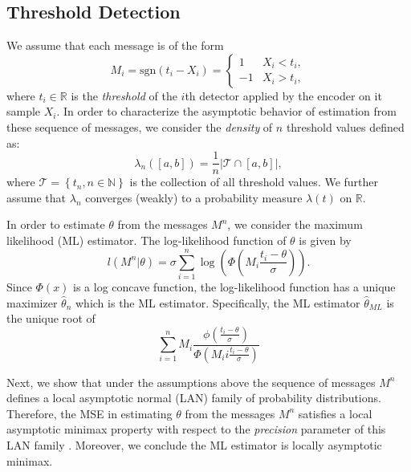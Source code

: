 \documentclass[letterpaper, conference]{IEEEtran}      %
\newcommand{\sgn}{\mathrm{sgn} }
\begin{document}
\subsection{Threshold Detection}
We assume that each message is of the form
\[
M_i = \sgn(t_i - X_i) = \begin{cases} 1 & X_i< t_i, \\
-1 & X_i > t_i,
\end{cases}  
\]
where $t_i\in\mathbb R$ is the \emph{threshold} of the $i$th detector applied by the encoder on it sample $X_i$. In order to characterize the asymptotic behavior of estimation from these sequence of messages, we consider the \emph{density} of $n$ threshold values defined as:
\[
\lambda_n([a,b]) = \frac{1}{n} \left| \mathcal T \cap [a,b] \right|,
\]
where $\mathcal T  = \left\{t_n, n \in \mathbb N \right\}$ is the collection of all threshold values. We further assume that $\lambda_n$ converges (weakly) to a probability measure $\lambda(t)$ on $\mathbb R$.  \par
In order to estimate $\theta$ from the messages $M^n$, we consider the maximum likelihood (ML) estimator. The log-likelihood function of $\theta$ is given by
\[
l(M^n  |\theta ) = \sigma  \sum_{i=1}^n \log \left( \Phi \left( M_i \frac{t_i - \theta}{\sigma} \right) \right). 
\]
Since $\Phi(x)$ is a log concave function, the log-likelihood function has a unique maximizer $\widehat{\theta}_n$ which is the ML estimator. Specifically, the ML estimator $\widehat{\theta}_{ML}$ is the unique root of 
\[
\sum_{i=1}^n M_i \frac{\phi \left( \frac{t_i-\theta}{\sigma}\right) }{\Phi \left(M_ii \frac{t_i-\theta}{\sigma}\right) }
\]

Next, we show that under the assumptions above the sequence of messages $M^n$ defines a local asymptotic normal (LAN) family of probability distributions. Therefore, the MSE in estimating $\theta$ from the messages $M^n$ satisfies a local asymptotic minimax property with respect to the \emph{precision} parameter of this LAN family \cite{van2000asymptotic}. Moreover, we conclude the ML estimator is locally asymptotic minimax. 
\end{document}

